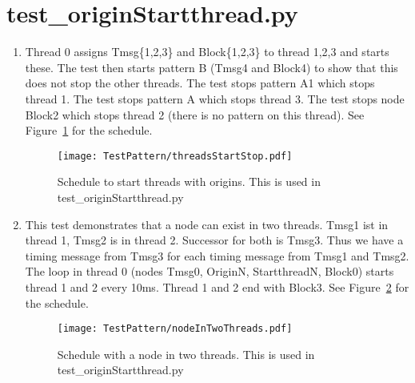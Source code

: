 \documentclass[12pt,a4paper]{report}
\begin{document}
\section{test\_originStartthread.py}
\begin{enumerate}
\item Thread 0 assigns Tmsg\{1,2,3\} and Block\{1,2,3\} to thread 1,2,3 and starts these.
The test then starts pattern B (Tmsg4 and Block4) to show that this does not stop the other threads.
The test stops pattern A1 which stops thread 1.
The test stops pattern A which stops thread 3.
The test stops node Block2 which stops thread 2 (there is no pattern on this thread).
See Figure~\ref{fig:schedule_origin_startthreads} for the schedule.
    \begin{figure}
        \centering
        \texttt{[image: TestPattern/threadsStartStop.pdf]}
        \caption{Schedule to start threads with origins. This is used in test\_originStartthread.py}
        \label{fig:schedule_origin_startthreads}
    \end{figure}
\item This test demonstrates that a node can exist in two threads.
Tmsg1 ist in thread 1, Tmsg2 is in thread 2. Successor for both is Tmsg3.
Thus we have a timing message from Tmsg3 for each timing message from Tmsg1 and Tmsg2.
The loop in thread 0 (nodes Tmsg0, OriginN, StartthreadN, Block0) starts
thread 1 and 2 every 10ms. Thread 1 and 2 end with Block3.
See Figure~\ref{fig:schedule_nodeInTwoThreads} for the schedule.
    \begin{figure}
        \centering
        \texttt{[image: TestPattern/nodeInTwoThreads.pdf]}
        \caption{Schedule with a node in two threads. This is used in test\_originStartthread.py}
        \label{fig:schedule_nodeInTwoThreads}
    \end{figure}
\end{enumerate}
\end{document}
